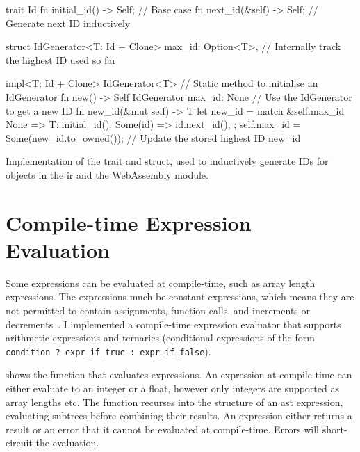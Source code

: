 \documentclass[../00-main.tex]{subfiles}
\begin{document}
\FloatBarrier %

\begin{listing}[!t]
  \begin{RustListing}
    trait Id {
        fn initial_id() -> Self;   // Base case
        fn next_id(&self) -> Self; // Generate next ID inductively
    }

    struct IdGenerator<T: Id + Clone> {
        max_id: Option<T>,         // Internally track the highest ID used so far
    }

    impl<T: Id + Clone> IdGenerator<T> {
        // Static method to initialise an IdGenerator
        fn new() -> Self {
            IdGenerator { max_id: None }
        }
        // Use the IdGenerator to get a new ID
        fn new_id(&mut self) -> T {
            let new_id = match &self.max_id {
                None => T::initial_id(),
                Some(id) => id.next_id(),
            };
            self.max_id = Some(new_id.to_owned()); // Update the stored highest ID
            new_id
        }
    }
  \end{RustListing}
  \caption{Implementation of the  trait and  struct, used to inductively generate IDs for objects in the \acrlong{ir} and the WebAssembly module.}
  \label{lst:Id and IdGenerator implementation}
\end{listing}


\section{Compile-time Expression Evaluation}\label{app:sec:compile time expression evaluation}

Some expressions can be evaluated at compile-time, such as array length expressions.
The expressions much be constant expressions, which means they are not permitted to contain assignments, function calls, and increments or decrements~.
I implemented a compile-time expression evaluator that supports arithmetic expressions and ternaries (conditional expressions of the form \texttt{condition~?~expr_if_true~:~expr_if_false}).

 shows the function that evaluates expressions.
An expression at compile-time can either evaluate to an integer or a float, however only integers are supported as array lengths etc.
The  function recurses into the structure of an \gls{ast} expression, evaluating subtrees before combining their results.
An expression either returns a result or an error that it cannot be evaluated at compile-time.
Errors will short-circuit the evaluation.
\end{document}
